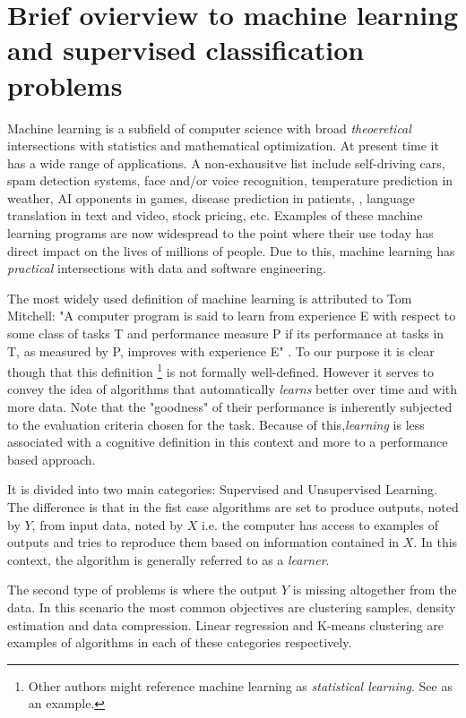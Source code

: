 
\section{ Brief ovierview to machine learning and supervised classification problems}\label{section-introduction}

Machine learning is a subfield of computer science with broad \textit{theoeretical} intersections with statistics and mathematical optimization. At present time it has a wide range of applications. A non-exhausitve list include self-driving cars, spam detection systems, face and/or voice recognition, temperature prediction in weather, AI opponents in games, disease prediction in patients, , language translation in text and video, stock pricing, etc. Examples of these machine learning programs are now widespread to the point where their use today has direct impact on the lives of millions of people. Due to this, machine learning has \textit{practical} intersections with data and software engineering.

The most widely used definition of machine learning is attributed to Tom Mitchell: 	 
"A computer program is said to learn from experience E with respect to some class of tasks T and performance measure P if its performance at tasks in T, as measured by P, improves with experience E" \cite{Mitchell-MLearning}. To our purpose it is clear though that this definition \footnote{Other authors might reference machine learning as \textit{statistical learning}. See \cite{hastie-elemstatslearn} as an example.} is not formally well-defined. However it serves to convey the idea of algorithms that automatically \textit{learns} better over time and with more data. Note that the "goodness" of their performance is inherently subjected to the evaluation criteria chosen for the task. Because of this,\textit{learning} is less associated with a cognitive definition in this context and more to a performance based approach.

It is divided into two main categories: Supervised and Unsupervised Learning. The difference is that in the fist case algorithms are set to produce outputs, noted by $Y$, from input data, noted by $X$ i.e. the computer has access to examples of outputs and tries to reproduce them based on information contained in $X$. In this context, the algorithm is generally referred to as a \textit{learner}.

The second type of problems is where the output $Y$ is missing altogether from the data. In this scenario the most common objectives are clustering samples, density estimation and data compression. Linear regression and K-means clustering are examples of algorithms in each of these categories respectively.

